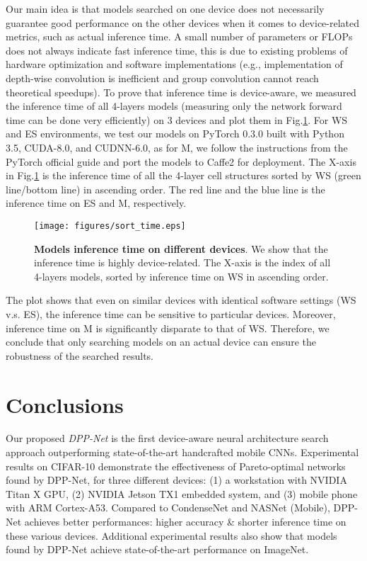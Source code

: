 \documentclass[runningheads]{llncs}
\def\eg{e.g.}
\begin{document}
Our main idea is that models searched on one device does not necessarily guarantee good performance on the other devices when it comes to device-related metrics, such as actual inference time. A small number of parameters or FLOPs does not always indicate fast inference time, this is due to existing problems of hardware optimization and software implementations (\eg, implementation of depth-wise convolution is inefficient and group convolution cannot reach theoretical speedups). To prove that inference time is device-aware, we measured the inference time of all 4-layers models (measuring only the network forward time can be done very efficiently) on 3 devices and plot them in Fig.\ref{fig.sort_time}. For WS and ES environments, we test our models on PyTorch 0.3.0 \cite{paszke2017automatic} built with Python 3.5, CUDA-8.0, and CUDNN-6.0, as for M, we follow the instructions from the PyTorch official guide and port the models to Caffe2 for deployment. The X-axis in Fig.\ref{fig.sort_time} is the inference time of all the 4-layer cell structures sorted by WS (green line/bottom line) in ascending order. The red line and the blue line is the inference time on ES and M, respectively.

\begin{figure}[h]
\begin{center}
\texttt{[image: figures/sort\_time.eps]}
\end{center}
\caption{\textbf{Models inference time on different devices}.
We show that the inference time is highly device-related. The X-axis is the index of all 4-layers models, sorted by inference time on WS in ascending order.}
\label{fig.sort_time}
\end{figure}

The plot shows that even on similar devices with identical software settings (WS v.s. ES), the inference time can be sensitive to particular devices. Moreover, inference time on M is significantly disparate to that of WS. Therefore, we conclude that only searching models on an actual device can ensure the robustness of the searched results.

\section{Conclusions}

Our proposed \textit{DPP-Net} is the first device-aware neural architecture search approach outperforming state-of-the-art handcrafted mobile CNNs.
Experimental results on CIFAR-10 demonstrate the effectiveness of Pareto-optimal networks found by DPP-Net, for three different devices: (1) a workstation with NVIDIA Titan X GPU, (2) NVIDIA Jetson TX1 embedded system, and (3) mobile phone with ARM Cortex-A53. Compared to CondenseNet and NASNet (Mobile), DPP-Net achieves better performances: higher accuracy \& shorter inference time on these various devices. Additional experimental results also show that models found by DPP-Net achieve state-of-the-art performance on ImageNet.
\end{document}
